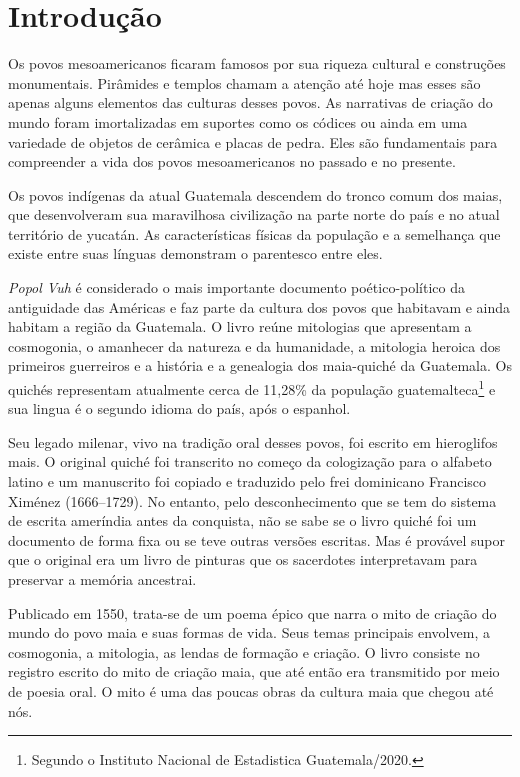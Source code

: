 \documentclass[12pt]{extarticle}
\begin{document}
\tableofcontents

\section{Introdução}


Os povos mesoamericanos ficaram famosos por sua riqueza cultural e construções monumentais. 
Pirâmides e templos chamam a atenção até hoje mas esses são apenas alguns elementos das culturas desses povos.
As narrativas de criação do mundo foram imortalizadas em suportes como os códices ou ainda em uma variedade de objetos de cerâmica e placas de pedra.
Eles são fundamentais para compreender a vida dos povos mesoamericanos no passado e no presente.

Os povos indígenas da atual Guatemala descendem do tronco comum dos maias, que desenvolveram sua maravilhosa civilização na parte norte do país e no atual território de yucatán.
As características físicas da população e a semelhança que existe entre suas línguas demonstram o parentesco entre eles.

\textit{Popol Vuh} é considerado o mais importante documento poético-político da antiguidade das Américas e faz parte da cultura dos povos que habitavam e ainda habitam a região da Guatemala. O livro reúne mitologias que apresentam a cosmogonia, o amanhecer da natureza e da humanidade, a mitologia heroica dos primeiros guerreiros e a história e a genealogia dos maia-quiché da Guatemala. Os quichés representam atualmente cerca de 11,28\% da população guatemalteca\footnote{Segundo o Instituto Nacional de Estadistica Guatemala/2020.} e sua lingua é o segundo idioma do país, após o espanhol.

Seu legado milenar, vivo na tradição oral desses povos, foi escrito em hieroglifos mais. O original quiché foi transcrito no começo da cologização para o alfabeto latino e um manuscrito foi copiado e traduzido pelo frei dominicano Francisco Ximénez (1666–1729). No entanto, pelo desconhecimento que se tem do sistema de escrita ameríndia antes da conquista, não se sabe se o livro quiché foi um documento de forma fixa ou se teve outras versões escritas.
Mas é provável supor que o original era um livro de pinturas que os sacerdotes interpretavam  para preservar a memória ancestrai.


Publicado em 1550, trata-se de um poema épico que narra o mito de criação do mundo do povo maia e suas formas de vida.
Seus temas principais envolvem, a cosmogonia, a mitologia, as lendas de formação e criação. O livro consiste no registro escrito do mito de criação maia, que até então era transmitido por meio de poesia oral.
O mito é uma das poucas obras da cultura maia que chegou até nós.
\end{document}
